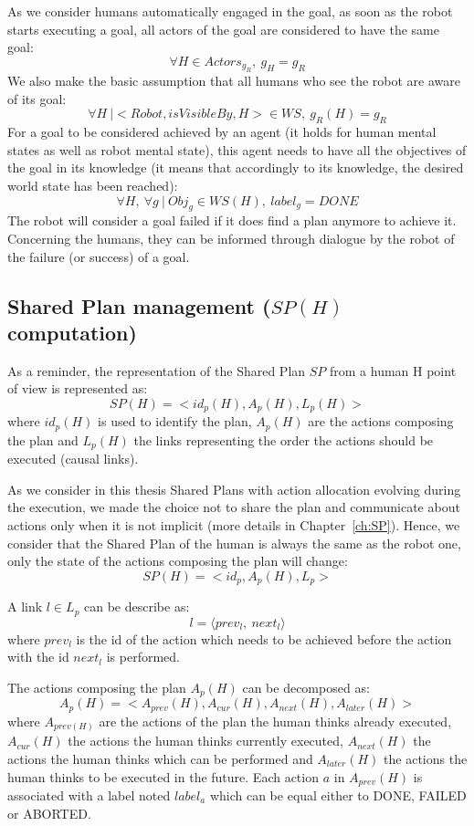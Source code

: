 \documentclass[english,a4paper,11pt,twoside]{StyleThese}
\begin{document}
As we consider humans automatically engaged in the goal, as soon as the robot starts executing a goal, all actors of the goal are considered to have the same goal:
$$ \forall H \in Actors_{g_R}, \ g_H = g_R$$
We also make the basic assumption that all humans who see the robot are aware of its goal:
$$ \forall H  \ | <Robot, isVisibleBy, H> \in WS, \ g_R(H) = g_R$$
For a goal to be considered achieved by an agent (it holds for human mental states as well as robot mental state), this agent needs to have all the objectives of the goal in its knowledge (it means that accordingly to its knowledge, the desired world state has been reached):
$$ \forall H, \ \forall g  \ | \ Obj_g \in WS(H), \ label_g = DONE$$
The robot will consider a goal failed if it does find a plan anymore to achieve it. Concerning the humans, they can be informed through dialogue by the robot of the failure (or success) of a goal.

\subsection{Shared Plan management ($SP(H)$ computation)}

As a reminder, the representation of the Shared Plan $SP$ from a human H point of view is represented as:
$$SP(H) = <id_p(H), A_p(H), L_p(H)>$$
where $id_p(H)$ is used to identify the plan, $A_p(H)$ are the actions composing the plan and $L_p(H)$ the links representing the order the actions should be executed (causal links).

As we consider in this thesis Shared Plans with action allocation evolving during the execution, we made the choice not to share the plan and communicate about actions only when it is not implicit (more details in Chapter~\ref{ch:SP}). Hence, we consider that the Shared Plan of the human is always the same as the robot one, only the state of the actions composing the plan will change:
$$SP(H) = <id_p, A_p(H), L_p>$$

A link $l \in L_p$ can be describe as:
 $$l = \langle prev_l, \ next_l \rangle$$
where $prev_l$ is the id of the action which needs to be achieved before the action with the id $next_l$ is performed. 

The actions composing the plan $A_p(H)$ can be decomposed as:
$$A_p(H) = <A_{prev}(H), A_{cur}(H), A_{next}(H), A_{later}(H)>$$
where $A_{prev(H)}$ are the actions of the plan the human thinks already executed, $A_{cur}(H)$ the actions the human thinks currently executed, $A_{next}(H)$ the actions the human thinks which can be performed and $A_{later}(H)$ the actions the human thinks to be executed in the future. Each action $a$ in $A_{prev}(H)$ is associated with a label noted $label_a$ which can be equal either to DONE, FAILED or ABORTED.
\end{document}
